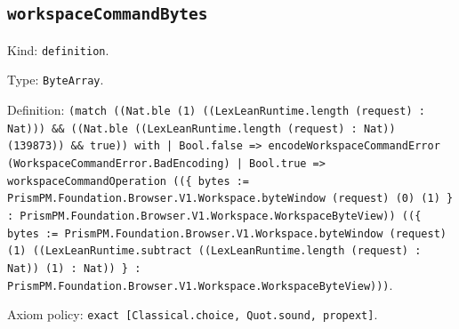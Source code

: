 \documentclass[11pt]{article}
\begin{document}
\subsection*{\texttt{workspaceCommandBytes}}
\noindent Kind: \texttt{definition}.\par
\noindent Type: \texttt{ByteArray}.\par
\noindent Definition: \texttt{(match ((Nat.ble (1) ((LexLeanRuntime.length (request) : Nat))) \&\& ((Nat.ble ((LexLeanRuntime.length (request) : Nat)) (139873)) \&\& true)) with | Bool.false => encodeWorkspaceCommandError (WorkspaceCommandError.BadEncoding) | Bool.true => workspaceCommandOperation ((\{ bytes := PrismPM.Foundation.Browser.V1.Workspace.byteWindow (request) (0) (1) \} : PrismPM.Foundation.Browser.V1.Workspace.WorkspaceByteView)) ((\{ bytes := PrismPM.Foundation.Browser.V1.Workspace.byteWindow (request) (1) ((LexLeanRuntime.subtract ((LexLeanRuntime.length (request) : Nat)) (1) : Nat)) \} : PrismPM.Foundation.Browser.V1.Workspace.WorkspaceByteView)))}.\par
\noindent Axiom policy: \texttt{exact [Classical.choice, Quot.sound, propext]}.\par
\end{document}
